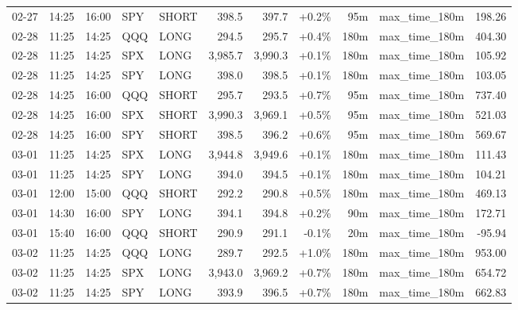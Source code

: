 \documentclass[11pt,a4paper,twoside]{article}
\begin{document}
\begin{center}
\begin{longtable}{>{\color{txtmain}}l l l l l r r r r >{\color{txtmain}}l r}
02-27 & 14:25 & 16:00 & SPY & SHORT & 398.5 & 397.7 & \textcolor{wingreen}{+0.2\%} & 95m & max\_time\_180m & \textcolor{wingreen}{198.26} \\
02-28 & 11:25 & 14:25 & QQQ & LONG & 294.5 & 295.7 & \textcolor{wingreen}{+0.4\%} & 180m & max\_time\_180m & \textcolor{wingreen}{404.30} \\
02-28 & 11:25 & 14:25 & SPX & LONG & 3,985.7 & 3,990.3 & \textcolor{wingreen}{+0.1\%} & 180m & max\_time\_180m & \textcolor{wingreen}{105.92} \\
02-28 & 11:25 & 14:25 & SPY & LONG & 398.0 & 398.5 & \textcolor{wingreen}{+0.1\%} & 180m & max\_time\_180m & \textcolor{wingreen}{103.05} \\
02-28 & 14:25 & 16:00 & QQQ & SHORT & 295.7 & 293.5 & \textcolor{wingreen}{+0.7\%} & 95m & max\_time\_180m & \textcolor{wingreen}{737.40} \\
02-28 & 14:25 & 16:00 & SPX & SHORT & 3,990.3 & 3,969.1 & \textcolor{wingreen}{+0.5\%} & 95m & max\_time\_180m & \textcolor{wingreen}{521.03} \\
02-28 & 14:25 & 16:00 & SPY & SHORT & 398.5 & 396.2 & \textcolor{wingreen}{+0.6\%} & 95m & max\_time\_180m & \textcolor{wingreen}{569.67} \\
03-01 & 11:25 & 14:25 & SPX & LONG & 3,944.8 & 3,949.6 & \textcolor{wingreen}{+0.1\%} & 180m & max\_time\_180m & \textcolor{wingreen}{111.43} \\
03-01 & 11:25 & 14:25 & SPY & LONG & 394.0 & 394.5 & \textcolor{wingreen}{+0.1\%} & 180m & max\_time\_180m & \textcolor{wingreen}{104.21} \\
03-01 & 12:00 & 15:00 & QQQ & SHORT & 292.2 & 290.8 & \textcolor{wingreen}{+0.5\%} & 180m & max\_time\_180m & \textcolor{wingreen}{469.13} \\
03-01 & 14:30 & 16:00 & SPY & LONG & 394.1 & 394.8 & \textcolor{wingreen}{+0.2\%} & 90m & max\_time\_180m & \textcolor{wingreen}{172.71} \\
03-01 & 15:40 & 16:00 & QQQ & SHORT & 290.9 & 291.1 & \textcolor{lossred}{-0.1\%} & 20m & max\_time\_180m & \textcolor{lossred}{-95.94} \\
03-02 & 11:25 & 14:25 & QQQ & LONG & 289.7 & 292.5 & \textcolor{wingreen}{+1.0\%} & 180m & max\_time\_180m & \textcolor{wingreen}{953.00} \\
03-02 & 11:25 & 14:25 & SPX & LONG & 3,943.0 & 3,969.2 & \textcolor{wingreen}{+0.7\%} & 180m & max\_time\_180m & \textcolor{wingreen}{654.72} \\
03-02 & 11:25 & 14:25 & SPY & LONG & 393.9 & 396.5 & \textcolor{wingreen}{+0.7\%} & 180m & max\_time\_180m & \textcolor{wingreen}{662.83} \\

\end{longtable}
\end{center}
\end{document}
